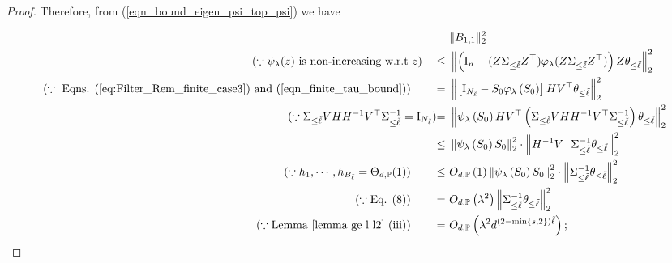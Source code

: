 \documentclass{article}
\theoremstyle{plain}
\theoremstyle{definition}
\theoremstyle{remark}
\newcommand{\reg}{\varphi_\lambda}
\newcommand{\rem}{\psi_\lambda}
\newcommand{\green}{\color{green}}
\newcommand{\dhnote}[1]{{\color{red}[#1]} } %
\begin{document}
\begin{appendix}
\begin{proof}







Therefore, from (\ref{eqn_bound_eigen_psi_top_psi}) we have

\begin{equation}\label{eqn_B11}
    \begin{aligned}
       &~ \|B_{1, 1}\|_2^2 \\
       (\because \rem(z) \text{ is non-increasing  w.r.t } z)\quad \leq&~
       \left\| \left( \mathrm{I}_n - (Z\Sigma_{\leq \tilde{\ell}} Z^{\top}) \reg(Z\Sigma_{\leq \tilde{\ell}} Z^{\top} ) \right) 
                Z\theta_{\leq \tilde{\ell}} \right\|_{2}^{2}\\
                (\because \text{ Eqns. (\ref{eq:Filter_Rem_finite_case3}) and (\ref{eqn_finite_tau_bound})} )\qquad =
        &~\left\| \left[ \mathrm{I}_{N_{\tilde{\ell}}} - S_0 \reg\left(S_0 \right) \right]  H V^{\top}\theta_{\leq \tilde{\ell}} \right\|_{2}^{2}\\
   (\because \Sigma_{\leq \tilde{\ell}} VH H^{-1} V^{\top}  \Sigma_{\leq \tilde{\ell}}^{-1}=\mathrm{I}_{N_{\tilde{\ell}}}) 
   {=}
     &~\left\| \rem\left( S_0 \right) HV^{\top} \left(\Sigma_{\leq \tilde{\ell}} VH H^{-1} V^{\top}  \Sigma_{\leq \tilde{\ell}}^{-1}\right) \theta_{\leq \tilde{\ell}} \right\|_{2}^{2}\\
        \leq &~
        \left\| \rem\left(S_0\right) S_0 \right\|_{2}^{2} \cdot \left\| H^{-1} V^{\top}  \Sigma_{\leq \tilde{\ell}}^{-1} \theta_{\leq \tilde{\ell}} \right\|_{2}^{2}\\
(\because h_1, \cdots, h_{B_{\tilde{\ell}}} = \Theta_{d, \mathbb{P}}(1)) \qquad        \leq &~
        O_{d, \mathbb{P}}\left(1\right)\left\| \rem\left(S_0\right) S_0 \right\|_{2}^{2} \cdot \left\|\Sigma_{\leq \tilde{\ell}}^{-1} \theta_{\leq \tilde{\ell}} \right\|_{2}^{2}\\
        (\because \text{Eq. (8)}) \qquad = 
        &~O_{d, \mathbb{P}}\left(\lambda^{2}\right) \left\| \Sigma_{\leq \tilde{\ell}}^{-1}\theta_{\leq \tilde{\ell}} \right\|_{2}^{2}\\
                (\because \text{Lemma~\ref{lemma ge l l2} (iii)}) \qquad = &~
                O_{d, \mathbb{P}}\left(  \lambda^{2} d^{(2-\min\{s, 2\})\tilde{\ell} }\right);
    \end{aligned}
\end{equation}



\end{proof}
\end{appendix}
\end{document}
